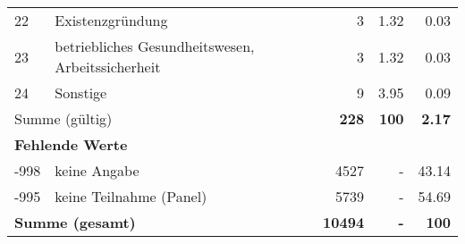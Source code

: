 \begin{longtable}{lXrrr}
        22 & \multicolumn{1}{X}{Existenzgründung} & %
          \num{3} &
          \num[round-mode=places,round-precision=2]{1,32} &
          \num[round-mode=places,round-precision=2]{0,03} \\

        23 & \multicolumn{1}{X}{betriebliches Gesundheitswesen, Arbeitssicherheit} & %
          \num{3} &
          \num[round-mode=places,round-precision=2]{1,32} &
          \num[round-mode=places,round-precision=2]{0,03} \\

        24 & \multicolumn{1}{X}{Sonstige} & %
          \num{9} &
          \num[round-mode=places,round-precision=2]{3,95} &
          \num[round-mode=places,round-precision=2]{0,09} \\

     \midrule
     \multicolumn{2}{l}{Summe (gültig)} &
       \textbf{\num{228}} &
     \textbf{100} &
       \textbf{\num[round-mode=places,round-precision=2]{2,17}} \\
     \multicolumn{5}{l}{\textbf{Fehlende Werte}}\\
       -998 &
       keine Angabe &
         \num{4527} &
        - &
         \num[round-mode=places,round-precision=2]{43,14} \\
       -995 &
       keine Teilnahme (Panel) &
         \num{5739} &
        - &
         \num[round-mode=places,round-precision=2]{54,69} \\
     \midrule
     \multicolumn{2}{l}{\textbf{Summe (gesamt)}} &
          \textbf{\num{10494}} &
        \textbf{-} &
        \textbf{100} \\
     \bottomrule
     \end{longtable}
     

